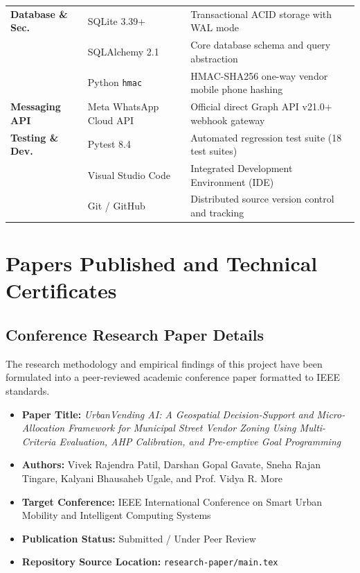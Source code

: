 \begin{table}[htbp]
\begin{tabularx}{\textwidth}{lp{}X}
\midrule
\textbf{Database \& Sec.}& SQLite 3.39+ & Transactional ACID storage with WAL mode \\
                         & SQLAlchemy 2.1 & Core database schema and query abstraction \\
                         & Python \texttt{hmac} & HMAC-SHA256 one-way vendor mobile phone hashing \\
\midrule
\textbf{Messaging API}   & Meta WhatsApp Cloud API & Official direct Graph API v21.0+ webhook gateway \\
\midrule
\textbf{Testing \& Dev.} & Pytest 8.4 & Automated regression test suite (18 test suites) \\
                         & Visual Studio Code & Integrated Development Environment (IDE) \\
                         & Git / GitHub & Distributed source version control and tracking \\
\bottomrule
\end{tabularx}
\end{table}

\clearpage

\chapter{Papers Published and Technical Certificates}
\label{app:publications}

\section*{Conference Research Paper Details}

The research methodology and empirical findings of this project have been formulated into a peer-reviewed academic conference paper formatted to IEEE standards.

\begin{itemize}
    \item \textbf{Paper Title:} \textit{UrbanVending AI: A Geospatial Decision-Support and Micro-Allocation Framework for Municipal Street Vendor Zoning Using Multi-Criteria Evaluation, AHP Calibration, and Pre-emptive Goal Programming}
    \item \textbf{Authors:} Vivek Rajendra Patil, Darshan Gopal Gavate, Sneha Rajan Tingare, Kalyani Bhausaheb Ugale, and Prof. Vidya R. More
    \item \textbf{Target Conference:} IEEE International Conference on Smart Urban Mobility and Intelligent Computing Systems
    \item \textbf{Publication Status:} Submitted / Under Peer Review
    \item \textbf{Repository Source Location:} \texttt{research-paper/main.tex}
\end{itemize}


